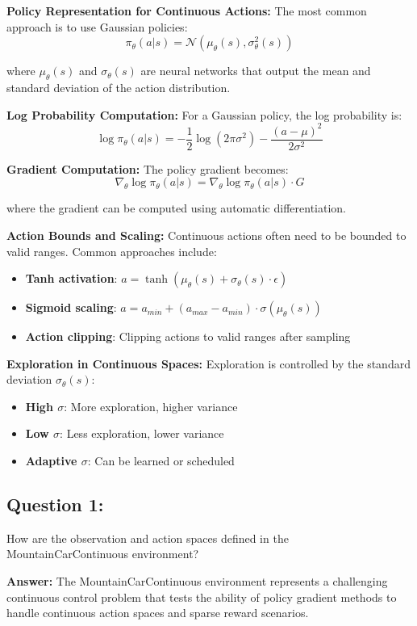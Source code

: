 \documentclass[12pt]{article}
\begin{document}
{{{\textbf{Policy Representation for Continuous Actions:}
The most common approach is to use Gaussian policies:
$$\pi_\theta(a|s) = \mathcal{N}(\mu_\theta(s), \sigma_\theta^2(s))$$

where $\mu_\theta(s)$ and $\sigma_\theta(s)$ are neural networks that output the mean and standard deviation of the action distribution.

\textbf{Log Probability Computation:}
For a Gaussian policy, the log probability is:
$$\log \pi_\theta(a|s) = -\frac{1}{2} \log(2\pi\sigma^2) - \frac{(a - \mu)^2}{2\sigma^2}$$

\textbf{Gradient Computation:}
The policy gradient becomes:
$$\nabla_\theta \log \pi_\theta(a|s) = \nabla_\theta \log \pi_\theta(a|s) \cdot G$$

where the gradient can be computed using automatic differentiation.

\textbf{Action Bounds and Scaling:}
Continuous actions often need to be bounded to valid ranges. Common approaches include:
\begin{itemize}
    \item \textbf{Tanh activation}: $a = \tanh(\mu_\theta(s) + \sigma_\theta(s) \cdot \epsilon)$
    \item \textbf{Sigmoid scaling}: $a = a_{min} + (a_{max} - a_{min}) \cdot \sigma(\mu_\theta(s))$
    \item \textbf{Action clipping}: Clipping actions to valid ranges after sampling
\end{itemize}

\textbf{Exploration in Continuous Spaces:}
Exploration is controlled by the standard deviation $\sigma_\theta(s)$:
\begin{itemize}
    \item \textbf{High $\sigma$}: More exploration, higher variance
    \item \textbf{Low $\sigma$}: Less exploration, lower variance
    \item \textbf{Adaptive $\sigma$}: Can be learned or scheduled
\end{itemize}

\subsection{Question 1:}

How are the observation and action spaces defined in the MountainCarContinuous environment?
\vspace*{0.3cm}

\textbf{Answer:} The MountainCarContinuous environment represents a challenging continuous control problem that tests the ability of policy gradient methods to handle continuous action spaces and sparse reward scenarios.

}}}
\end{document}
